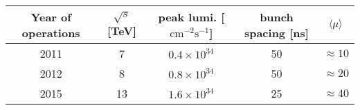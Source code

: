 \begin{tabular}{c|cccc}
  \hline\hline
  Year of operations      & $\sqrt{s}$ [TeV] & peak lumi. [$\text{cm}^{-2} \text{s}^{-1}$] & bunch spacing [ns] & $\langle\mu\rangle$    \\
  \hline
  2011                    &  7               & $0.4\times 10^{34}$                         & 50                 & $\approx 10$ \\
  2012                    &  8               & $0.8\times 10^{34}$                         & 50                 & $\approx 20$ \\
  2015                    & 13               & $1.6\times 10^{34}$                         & 25                 & $\approx 40$ \\
  \hline\hline
\end{tabular}

